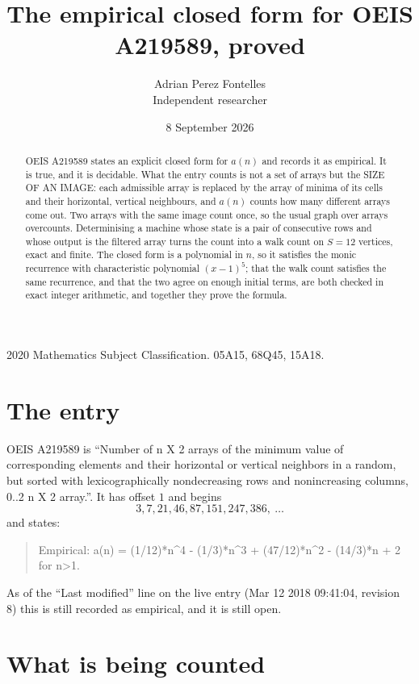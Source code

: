 \documentclass[11pt,a4paper]{article}
\title{The empirical closed form for OEIS A219589, proved}
\author{Adrian Perez Fontelles\\ \small Independent researcher}
\date{8 September 2026}
\theoremstyle{plain}
\theoremstyle{definition}
\begin{document}
\maketitle

\begin{abstract}
OEIS A219589 states an explicit closed form for $a(n)$ and records it as empirical. It is true, and
it is decidable. What the entry counts is not a set of arrays but the SIZE OF AN IMAGE: each
admissible array is replaced by the array of minima of its cells and their horizontal, vertical neighbours,
and $a(n)$ counts how many different arrays come out. Two arrays with the same image count
once, so the usual graph over arrays overcounts. Determinising a machine whose state is a pair
of consecutive rows and whose output is the filtered array turns the count into a walk count on
$S=12$ vertices, exact and finite. The closed form is a polynomial in $n$, so it satisfies the
monic recurrence with characteristic polynomial $(x-1)^{5}$; that the walk count
satisfies the same recurrence, and that the two agree on enough initial terms, are both checked
in exact integer arithmetic, and together they prove the formula.
\end{abstract}

\noindent\small 2020 Mathematics Subject Classification. 05A15, 68Q45, 15A18.\normalsize

\section{The entry}

OEIS A219589 is ``Number of n X 2 arrays of the minimum value of corresponding elements and their horizontal or vertical neighbors in a random, but sorted with lexicographically nondecreasing rows and nonincreasing columns, 0..2 n X 2 array.''. It has offset $1$ and begins
\[
3, 7, 21, 46, 87, 151, 247, 386,\ \dots
\]
and states:
\begin{quote}
Empirical: a(n) = (1/12)*n\^{}4 - (1/3)*n\^{}3 + (47/12)*n\^{}2 - (14/3)*n + 2 for n>1.
\end{quote}
As of the ``Last modified'' line on the live entry (Mar 12 2018 09:41:04, revision 8)
this is still recorded as empirical, and it is still open.

\section{What is being counted}
\end{document}
